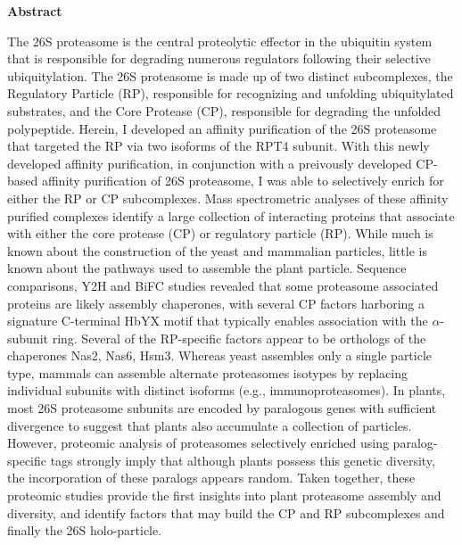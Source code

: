\textbf{Abstract}

The 26S proteasome is the central proteolytic effector in the ubiquitin system that is responsible for degrading numerous regulators following their selective ubiquitylation. The 26S proteasome is made up of two distinct subcomplexes, the Regulatory Particle (RP), responsible for recognizing and unfolding ubiquitylated substrates, and the Core Protease (CP), responsible for degrading the unfolded polypeptide. 
Herein, I developed an affinity purification of the 26S proteasome that targeted the RP via two isoforms of the RPT4 subunit. With this newly developed affinity purification, in conjunction with a preivously developed CP-based affinity purification of 26S proteasome, I was able to selectively enrich for either the RP or CP subcomplexes.
Mass spectrometric analyses of these affinity purified complexes identify a large collection of interacting proteins that associate with either the core protease (CP) or regulatory particle (RP).
While much is known about the construction of the yeast and mammalian particles, little is known about the pathways used to assemble the plant particle.
Sequence comparisons, Y2H and BiFC studies revealed that some proteasome associated proteins are likely assembly chaperones, with several CP factors harboring a signature C-terminal HbYX motif that typically enables association with the $\alpha$-subunit ring.
Several of the RP-specific factors appear to be orthologs of the chaperones Nas2, Nas6, Hsm3.
Whereas yeast assembles only a single particle type, mammals can assemble alternate proteasomes isotypes by replacing individual subunits with distinct isoforms (e.g., immunoproteasomes).
In plants, most 26S proteasome subunits are encoded by paralogous genes with sufficient divergence to suggest that plants also accumulate a collection of particles.
However, proteomic analysis of proteasomes selectively enriched using paralog-specific tags strongly imply that although plants possess this genetic diversity, the incorporation of these paralogs appears random.
Taken together, these proteomic studies provide the first insights into plant proteasome assembly and diversity, and identify factors that may build the CP and RP subcomplexes and finally the 26S holo-particle.